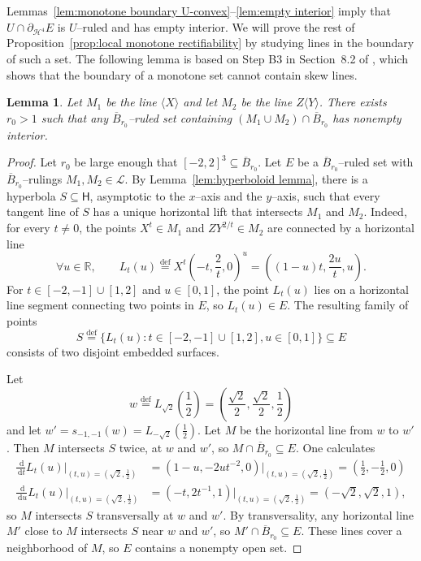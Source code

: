 \documentclass[11pt,reqno]{amsart}
\newcommand{\R}{\mathbb{R}}
\newcommand{\cH}{\mathcal{H}}
\newcommand{\cL}{\mathcal{L}}
\newcommand{\ud}[0]{\,\mathrm{d}}
\newcommand{\0}{\mathbf{0}}
\renewcommand{\1}{\mathbf 1}
\renewcommand{\mid}{:}
\renewcommand{\subset}{\subseteq}
\newcommand{\eqdef}{\stackrel{\mathrm{def}}{=}}
\newtheorem{lemma}[thm]{Lemma}
\theoremstyle{remark}
\begin{document}
Lemmas~\ref{lem:monotone boundary U-convex}--\ref{lem:empty interior} imply that $U\cap \partial_{\cH^4} E$ is $U$--ruled and has empty interior.  We will prove the rest of Proposition~\ref{prop:local monotone rectifiability} by studying  lines in the boundary of such a set. The following lemma is based on Step B3 in Section~8.2 of \cite{CKN}, which shows that the boundary of a monotone set cannot contain skew lines.
\begin{lemma}\label{lem:convex hull of perpendicular lines}
  Let $M_1$ be the line $\langle X\rangle$ and let $M_2$ be the line $Z\langle Y\rangle$.  There exists $r_0>1$ such that any $\overline{B}_{r_0}$--ruled set containing $(M_1\cup M_2)\cap \overline{B}_{r_0}$ has nonempty interior.
\end{lemma}
\begin{proof}
  Let $r_0$ be large enough that $[-2,2]^3\subset \overline{B}_{r_0}$.  Let $E$ be a $\overline{B}_{r_0}$--ruled set with $\overline{B}_{r_0}$--rulings $M_1,M_2\in \cL$. By Lemma~\ref{lem:hyperboloid lemma}, there is a hyperbola $S\subset \mathsf{H}$, asymptotic to the $x$--axis and the $y$--axis, such that every tangent line of $S$ has a unique horizontal lift that intersects $M_1$ and $M_2$.  Indeed, for every $t\ne 0$, the points $X^t\in M_1$ and $ZY^{2/t}\in M_2$ are connected by a horizontal line
  $$\forall u\in \R,\qquad L_t(u)\eqdef X^t \left(-t,\frac{2}{t},0\right)^u = \left( (1-u) t, \frac{2u}{t}, u\right).$$
  For $t\in [-2,-1]\cup [1,2]$ and $u\in [0,1]$, the point $L_t(u)$ lies on a horizontal line segment connecting two points in $E$, so $L_t(u)\in E$.  The resulting family of points
  $$S\eqdef\{L_t(u)\mid t\in [-2,-1]\cup [1,2], u\in [0,1]\}\subset E$$
  consists of two disjoint embedded surfaces.

  Let
  $$w \eqdef  L_{\sqrt{2}}\left(\frac{1}{2}\right) = \left(\frac{\sqrt{2}}{2},\frac{\sqrt{2}}{2},\frac{1}{2}\right)$$
  and let $w'=s_{-1,-1}(w)= L_{-\sqrt{2}}(\frac{1}{2})$. Let $M$ be the horizontal line from $w$ to $w'$. Then $M$ intersects $S$ twice, at $w$ and $w'$, so $M \cap \overline{B}_{r_0}\subset E$. One calculates
  \begin{align*}
    \frac{\ud}{\ud t} L_t(u)\big|_{(t,u)=(\sqrt{2}, \frac{1}{2})}
    &= ( 1-u, - 2u t^{-2}, 0) \big|_{(t,u)=(\sqrt{2}, \frac{1}{2})} = \left(\frac{1}{2},-\frac{1}{2},0\right)\\
    \frac{\ud}{\ud u} L_t(u) \big|_{(t,u)=(\sqrt{2}, \frac{1}{2})} &= ( -t, 2t^{-1}, 1) \big|_{(t,u)=(\sqrt{2}, \frac{1}{2})} = ( -\sqrt{2}, \sqrt{2}, 1),
  \end{align*}
  so $M$ intersects $S$ transversally at $w$ and $w'$. By transversality, any horizontal line $M'$ close to $M$ intersects $S$ near $w$ and $w'$, so $M' \cap \overline{B}_{r_0}\subset E$. These lines cover a neighborhood of $M$, so $E$ contains a nonempty open set.
\end{proof}
\end{document}
